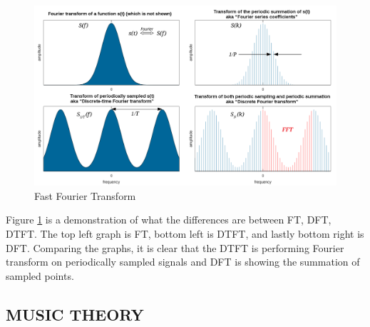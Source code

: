 \documentclass[12pt,a4paper]{article}
\begin{document}
\begin{figure}[h]
\begin{center}
	\includegraphics[width=0.7\linewidth]{FFT}
\end{center}
		\caption{Fast Fourier Transform}
		\label{fig:FFT}
\end{figure}
Figure \ref{fig:FFT} is a demonstration of what the differences are between FT, DFT, DTFT. The top left graph is FT, bottom left is DTFT, and lastly bottom right is DFT. Comparing the graphs, it is clear that the DTFT is performing Fourier transform on periodically sampled signals and DFT is showing the summation of sampled points.
\newpage
	\large
	\subsection{MUSIC THEORY}
	\label{sub:MUSIC THEORY}
	
\end{document}
